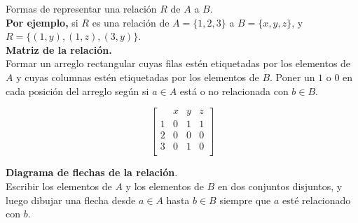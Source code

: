 
    
 \noindent   Formas de representar una relación $R$ de $A$ a $B$.  \\
 
 \noindent \textbf{Por ejemplo,} si $R$ es una relación de $A = \{1, 2, 3\}$ a $B = \{x, y, z\}$, y $R = \{(1, y), (1, z), (3, y)\}$. \\
    

    \noindent \textbf{ Matriz de la relación.}\\
    \noindent         Formar un arreglo rectangular cuyas filas estén etiquetadas por los elementos de $A$ y cuyas columnas estén etiquetadas por los elementos de $B$. Poner un $1$ o $0$ en cada posición del arreglo según si $a \in A$ está o no relacionada con $b \in B$.

                
                \[
                \begin{bmatrix}
                    & x & y & z \\
                  1 & 0 & 1 & 1 \\
                  2 & 0 & 0 & 0 \\
                  3 & 0 & 1 & 0 \\
                \end{bmatrix}
                \]

    \vspace{10px}
    \noindent \textbf{Diagrama de flechas de la relación}.\\
             Escribir los elementos de $A$ y los elementos de $B$ en dos conjuntos disjuntos, y luego dibujar una flecha desde $a \in A$ hasta $b \in B$ siempre que $a$ esté relacionado con $b$. 